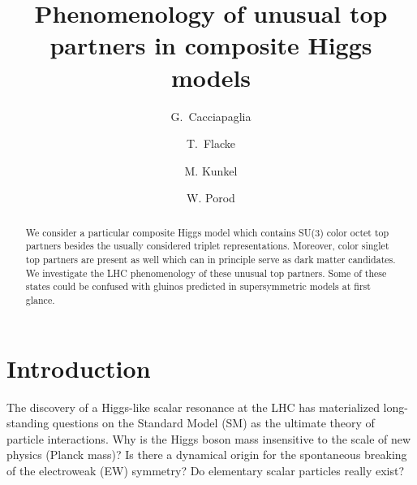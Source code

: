 \documentclass[preprintnumbers,nofootinbib,showpacs,eqsecnum,pre,12pt]{revtex4-1}
\begin{document}
\title{Phenomenology of unusual top partners in composite Higgs models}

\author{G.\ Cacciapaglia}
\author{T.\ Flacke}
\author{M. Kunkel}
\author{W. Porod}


\begin{abstract}
We consider a particular composite Higgs model which contains SU(3) color octet top partners besides the
usually considered triplet representations. Moreover, color singlet top partners are present as well which can in principle serve as dark matter candidates. We investigate the LHC phenomenology of these unusual top partners. Some of these states could be confused with gluinos predicted in supersymmetric models at first glance.
\end{abstract}


\maketitle

\tableofcontents

\newpage

\section{Introduction}

The discovery of a Higgs-like scalar resonance at the LHC \cite{ATLAS:2012yve,CMS:2012qbp} has materialized long-standing questions on the Standard Model (SM) as the ultimate theory of particle interactions. Why is the Higgs boson mass insensitive to the scale of new physics (Planck mass)? Is there a dynamical origin for the spontaneous breaking of the electroweak (EW) symmetry?
Do elementary scalar particles really exist?
\end{document}
